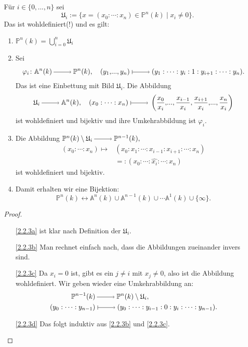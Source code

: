 \documentclass[a4paper,12pt,index=toc]{scrbook}
\theoremstyle{keinenummern} %
\def\A{\mathbb{A}}
\def\P{\mathbb{P}}
\def\U{\mathfrak{U}}
\renewcommand{\phi}{\varphi}
\renewcommand{\dotsc}{\ensuremath{\!...}}
\newcommand{\dach}{\widehat}
\begin{document}
\begin{db}\label{2.2.3}
Für $i\in\{0,\dotsc,n\}$ sei \begin{equation*}\U_{i}:=\{x=(x_{0}:\dotsm:x_{n})\in\P^{n}(k)\mid x_{i}\neq 0\}.\end{equation*} Das ist wohldefiniert(!) und es gilt:
\begin{enumerate}
\item{} $\displaystyle\P^{n}(k)=\bigcup_{i=0}^{n}\U_{i}$
\item{} Sei
\begin{equation*}\phi_{i}\colon\A^{n}(k)\ra \P^{n}(k),\quad(y_{1},\dotsc,y_{n})\mapsto(y_{1}:\dotsm:y_{i}:1:y_{i+1}:\dotsm:y_{n}).\end{equation*}
Das ist eine Einbettung mit Bild $\U_{i}$.
Die Abbildung
\begin{equation*}\U_{i}\ra\A^{n}(k),\quad(x_{0}:\dotsm:x_{n})\mapsto\left(\frac{x_{0}}{x_{i}},\dotsc,\frac{x_{i-1}}{x_{i}},\frac{x_{i+1}}{x_{i}},\dotsc,\frac{x_{n}}{x_{i}}\right)\end{equation*}
ist wohldefiniert und bijektiv und ihre Umkehrabbildung ist $\phi_{i}$.
\item{}
Die Abbildung $\P^{n}(k)\setminus \U_{i}\ra\P^{n-1}(k),$
\begin{align*}(x_{0}:\dotsm:x_{n})\mapsto&(x_{0}:x_{1}:\dotsm:x_{i-1}:x_{i+1}:\dotsm:x_{n})\\&=:(x_{0}:\dotsm:\dach{x_{i}}:\dotsm:x_{n})\end{align*}
ist wohldefiniert und bijektiv.
\item{} Damit erhalten wir eine Bijektion:
\begin{equation*}\P^{n}(k)\longleftrightarrow\A^{n}(k)\cup\A^{n-1}(k)\cup\dotsm\A^{1}(k)\cup\{\infty\}.\end{equation*}
\end{enumerate}\end{db}
\begin{proof}\begin{enumerate}
\item[\ref{2.2.3a}] ist klar nach Definition der $\U_{i}$.
\item[\ref{2.2.3b}] Man rechnet einfach nach, dass die Abbildungen zueinander invers sind.
\item[\ref{2.2.3c}] Da $x_{i}=0$ ist, gibt es ein $j\neq i$ mit $x_{j}\neq0$, also ist die Abbildung wohldefiniert. Wir geben wieder eine Umkehrabbildung an:
\begin{align*}\P^{n-1}(k)&\ra\P^{n}(k)\setminus \U_{i},\\(y_{0}:\dotsm:y_{n-1})&\mapsto(y_{0}:\dotsm:y_{i-1}:0:y_{i}:\dotsm:y_{n-1}).\end{align*}
\item[\ref{2.2.3d}] Das folgt induktiv aus \ref{2.2.3b} und \ref{2.2.3c}.
\end{enumerate}\end{proof}
\end{document}
